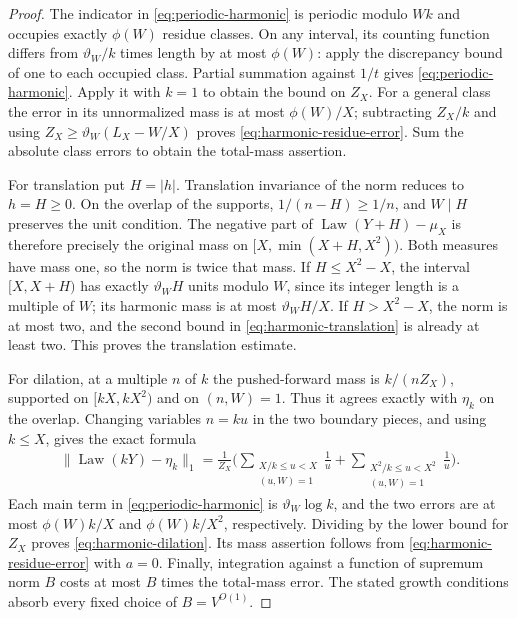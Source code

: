 \begin{proof}
The indicator in \eqref{eq:periodic-harmonic} is periodic modulo
\(Wk\) and occupies exactly \(\phi(W)\) residue classes.  On any
interval, its counting function differs from
\(\vartheta_W/k\) times length by at most \(\phi(W)\): apply
the discrepancy bound of one to each occupied class.  Partial
summation against \(1/t\) gives \eqref{eq:periodic-harmonic}.
Apply it with \(k=1\) to obtain the bound on \(Z_X\).
For a general class the error in its unnormalized mass is at most
\(\phi(W)/X\); subtracting \(Z_X/k\) and using
\(Z_X\ge\vartheta_W(L_X-W/X)\) proves
\eqref{eq:harmonic-residue-error}.  Sum the absolute class errors
to obtain the total-mass assertion.

For translation put \(H=|h|\).  Translation invariance of the norm
reduces to \(h=H\ge0\).  On the overlap of the supports,
\(1/(n-H)\ge1/n\), and \(W\mid H\) preserves the unit
condition.  The negative part of
\(\operatorname{Law}(Y+H)-\mu_X\) is therefore precisely the
original mass on \([X,\min(X+H,X^2))\).  Both measures have
mass one, so the norm is twice that mass.  If
\(H\le X^2-X\), the interval \([X,X+H)\) has exactly
\(\vartheta_WH\) units modulo \(W\), since its integer length
is a multiple of \(W\); its harmonic mass is at most
\(\vartheta_WH/X\).  If \(H>X^2-X\), the norm is at most two,
and the second bound in \eqref{eq:harmonic-translation} is already
at least two.  This proves the translation estimate.

For dilation, at a multiple \(n\) of \(k\) the pushed-forward
mass is \(k/(nZ_X)\), supported on \([kX,kX^2)\) and on
\((n,W)=1\).  Thus it agrees exactly with \(\eta_k\) on the
overlap.  Changing variables \(n=ku\) in the two boundary pieces,
and using \(k\le X\), gives the exact formula
\begin{align*}
 \|\operatorname{Law}(kY)-\eta_k\|_1
 =\frac1{Z_X}\bigg(
  \sum_{\substack{X/k\le u<X\\(u,W)=1}}\frac1u
  +\sum_{\substack{X^2/k\le u<X^2\\(u,W)=1}}\frac1u
 \bigg).
\end{align*}
Each main term in \eqref{eq:periodic-harmonic} is
\(\vartheta_W\log k\), and the two errors are at most
\(\phi(W)k/X\) and \(\phi(W)k/X^2\), respectively.
Dividing by the lower bound for \(Z_X\) proves
\eqref{eq:harmonic-dilation}.  Its mass assertion follows from
\eqref{eq:harmonic-residue-error} with \(a=0\).
Finally, integration against a function of supremum norm \(B\)
costs at most \(B\) times the total-mass error.  The stated growth
conditions absorb every fixed choice of \(B=V^{O(1)}\).
\end{proof}

